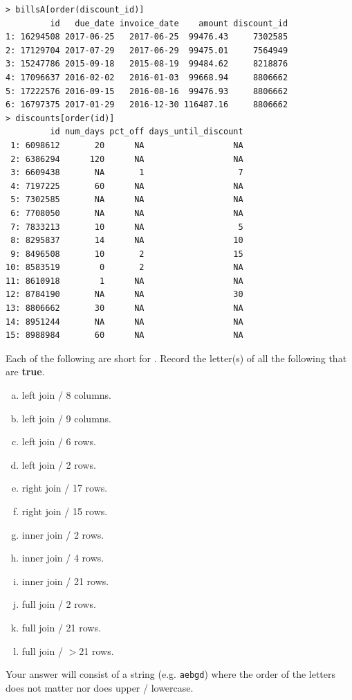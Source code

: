 \documentclass[12pt]{article}
\newcommand{\instr}{\small Your answer will consist of a string (e.g. \texttt{aebgd}) where the order of the letters does not matter nor does upper / lowercase. \normalsize}
\begin{document}
\begin{lstlisting}
> billsA[order(discount_id)]
         id   due_date invoice_date    amount discount_id
1: 16294508 2017-06-25   2017-06-25  99476.43     7302585
2: 17129704 2017-07-29   2017-06-29  99475.01     7564949
3: 15247786 2015-09-18   2015-08-19  99484.62     8218876
4: 17096637 2016-02-02   2016-01-03  99668.94     8806662
5: 17222576 2016-09-15   2016-08-16  99476.93     8806662
6: 16797375 2017-01-29   2016-12-30 116487.16     8806662
> discounts[order(id)]
         id num_days pct_off days_until_discount
 1: 6098612       20      NA                  NA
 2: 6386294      120      NA                  NA
 3: 6609438       NA       1                   7
 4: 7197225       60      NA                  NA
 5: 7302585       NA      NA                  NA
 6: 7708050       NA      NA                  NA
 7: 7833213       10      NA                   5
 8: 8295837       14      NA                  10
 9: 8496508       10       2                  15
10: 8583519        0       2                  NA
11: 8610918        1      NA                  NA
12: 8784190       NA      NA                  30
13: 8806662       30      NA                  NA
14: 8951244       NA      NA                  NA
15: 8988984       60      NA                  NA
\end{lstlisting}
\vspace{-1cm}
\benum


 Each of the following are short for . Record the letter(s) of all the following that are \textbf{true}. 


\begin{enumerate}[(a)]
\item left join / 8 columns.
\item left join / 9 columns.
\item left join / 6 rows.
\item left join / 2 rows.
\item right join / 17 rows.
\item right join / 15 rows.
\item inner join / 2 rows.
\item inner join / 4 rows.
\item inner join / 21 rows.
\item full join / 2 rows.
\item full join / 21 rows.
\item full join / $>$21 rows.
\end{enumerate}
\eenum\instr\pagebreak
\end{document}
